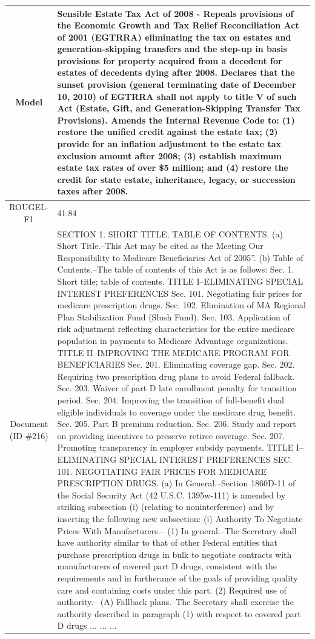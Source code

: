 \begin{table}[bth!]
\begin{tabular}{c|p{}}
\\ \hline
Model & 
Sensible Estate Tax Act of 2008 - Repeals provisions of the Economic Growth and Tax Relief Reconciliation Act of 2001 (EGTRRA) eliminating the tax on estates and generation-skipping transfers and the step-up in basis provisions for property acquired from a decedent for estates of decedents dying after 2008. Declares that the sunset provision (general terminating date of December 10, 2010) of EGTRRA shall not apply to title V of such Act (Estate, Gift, and Generation-Skipping Transfer Tax Provisions). Amends the Internal Revenue Code to: (1) restore the unified credit against the estate tax; (2) provide for an inflation adjustment to the estate tax exclusion amount after 2008; (3) establish maximum estate tax rates of over \$5 million; and (4) restore the credit for state estate, inheritance, legacy, or succession taxes after 2008.
\\ \hline
ROUGEL-F1 & 
41.84
\\ \hline
\makecell{Document\\(ID \#216)} & 
SECTION 1. SHORT TITLE; TABLE OF CONTENTS. (a) Short Title.--This Act may be cited as the   Meeting Our Responsibility to Medicare Beneficiaries Act of 2005''. (b) Table of Contents.--The table of contents of this Act is as follows: Sec. 1. Short title; table of contents. TITLE I--ELIMINATING SPECIAL INTEREST PREFERENCES Sec. 101. Negotiating fair prices for medicare prescription drugs. Sec. 102. Elimination of MA Regional Plan Stabilization Fund (Slush Fund). Sec. 103. Application of risk adjustment reflecting characteristics for the entire medicare population in payments to Medicare Advantage organizations. TITLE II--IMPROVING THE MEDICARE PROGRAM FOR BENEFICIARIES Sec. 201. Eliminating coverage gap. Sec. 202. Requiring two prescription drug plans to avoid Federal fallback. Sec. 203. Waiver of part D late enrollment penalty for transition period. Sec. 204. Improving the transition of full-benefit dual eligible individuals to coverage under the medicare drug benefit. Sec. 205. Part B premium reduction. Sec. 206. Study and report on providing incentives to preserve retiree coverage. Sec. 207. Promoting transparency in employer subsidy payments. TITLE I--ELIMINATING SPECIAL INTEREST PREFERENCES SEC. 101. NEGOTIATING FAIR PRICES FOR MEDICARE PRESCRIPTION DRUGS. (a) In General.--Section 1860D-11 of the Social Security Act (42 U.S.C. 1395w-111) is amended by striking subsection (i) (relating to noninterference) and by inserting the following new subsection:   (i) Authority To Negotiate Prices With Manufacturers.--   (1) In general.--The Secretary shall have authority similar to that of other Federal entities that purchase prescription drugs in bulk to negotiate contracts with manufacturers of covered part D drugs, consistent with the requirements and in furtherance of the goals of providing quality care and containing costs under this part.   (2) Required use of authority.--   (A) Fallback plans.--The Secretary shall exercise the authority described in paragraph (1) with respect to covered part D drugs ... ... ... 

\end{tabular}
\end{table}
